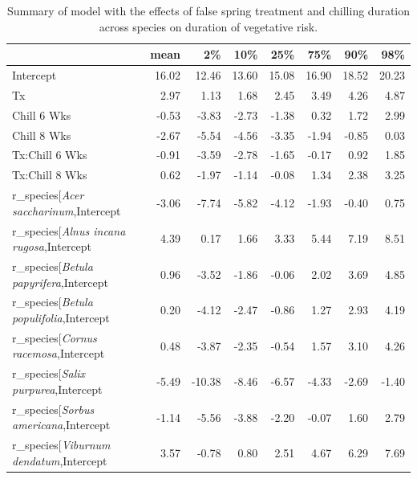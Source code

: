 \documentclass{article}\usepackage[]{graphicx}\usepackage[]{color}
\makeatletter
\newenvironment{kframe}{%
 \def\at@end@of@kframe{}%
 \ifinner\ifhmode%
  \def\at@end@of@kframe{\end{minipage}}%
  \begin{minipage}{\columnwidth}%
 \fi\fi%
 \def\FrameCommand##1{\hskip\@totalleftmargin \hskip-\fboxsep
 \colorbox{shadecolor}{##1}\hskip-\fboxsep
     \hskip-\linewidth \hskip-\@totalleftmargin \hskip\columnwidth}%
 \MakeFramed {\advance\hsize-\width
   \@totalleftmargin\z@ \linewidth\hsize
   \@setminipage}}%
 {\par\unskip\endMakeFramed%
 \at@end@of@kframe}
\makeatother
\begin{document}
\begin{kframe}


{\ttfamily\noindent\bfseries\color{errorcolor}{\#\# Error in gsub("{}r\_species["{}, "{}"{}, modoutput\$term): invalid regular expression 'r\_species[', reason 'Missing ']''}}\end{kframe}%
\begin{longtable}{lrrrrrrr}
\caption{Summary of model with the effects of false spring treatment and chilling duration across species on duration of vegetative risk.} \\ 
  \hline
 & mean & 2\% & 10\% & 25\% & 75\% & 90\% & 98\% \\ 
  \hline \endhead  \hline
Intercept & 16.02 & 12.46 & 13.60 & 15.08 & 16.90 & 18.52 & 20.23 \\ 
  Tx & 2.97 & 1.13 & 1.68 & 2.45 & 3.49 & 4.26 & 4.87 \\ 
  Chill 6 Wks & -0.53 & -3.83 & -2.73 & -1.38 & 0.32 & 1.72 & 2.99 \\ 
  Chill 8 Wks & -2.67 & -5.54 & -4.56 & -3.35 & -1.94 & -0.85 & 0.03 \\ 
  Tx:Chill 6 Wks & -0.91 & -3.59 & -2.78 & -1.65 & -0.17 & 0.92 & 1.85 \\ 
  Tx:Chill 8 Wks & 0.62 & -1.97 & -1.14 & -0.08 & 1.34 & 2.38 & 3.25 \\ 
  r_species[\textit{Acer saccharinum},Intercept & -3.06 & -7.74 & -5.82 & -4.12 & -1.93 & -0.40 & 0.75 \\ 
  r_species[\textit{Alnus incana rugosa},Intercept & 4.39 & 0.17 & 1.66 & 3.33 & 5.44 & 7.19 & 8.51 \\ 
  r_species[\textit{Betula papyrifera},Intercept & 0.96 & -3.52 & -1.86 & -0.06 & 2.02 & 3.69 & 4.85 \\ 
  r_species[\textit{Betula populifolia},Intercept & 0.20 & -4.12 & -2.47 & -0.86 & 1.27 & 2.93 & 4.19 \\ 
  r_species[\textit{Cornus racemosa},Intercept & 0.48 & -3.87 & -2.35 & -0.54 & 1.57 & 3.10 & 4.26 \\ 
  r_species[\textit{Salix purpurea},Intercept & -5.49 & -10.38 & -8.46 & -6.57 & -4.33 & -2.69 & -1.40 \\ 
  r_species[\textit{Sorbus americana},Intercept & -1.14 & -5.56 & -3.88 & -2.20 & -0.07 & 1.60 & 2.79 \\ 
  r_species[\textit{Viburnum dendatum},Intercept & 3.57 & -0.78 & 0.80 & 2.51 & 4.67 & 6.29 & 7.69 \\ 

\end{longtable}
\end{document}
